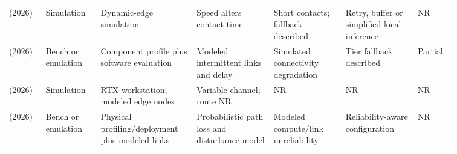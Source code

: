 \begin{table}[!tp]
\begin{tabular}{@{}Y{0.0705\linewidth}Y{0.1090\linewidth}Y{0.1598\linewidth}Y{0.1532\linewidth}Y{0.1466\linewidth}Y{0.1438\linewidth}Y{0.0724\linewidth}@{}}
\cite{R0058}\newline\mbox{(2026)} & Simulation & Dynamic-edge simulation & Speed alters contact time & Short contacts; fallback described & Retry, buffer or simplified local inference & NR \\
\cite{R0063}\newline\mbox{(2026)} & Bench or emulation & Component profile plus software evaluation & Modeled intermittent links and delay & Simulated connectivity degradation & Tier fallback described & Partial \\
\cite{R0107}\newline\mbox{(2026)} & Simulation & RTX workstation; modeled edge nodes & Variable channel; route NR & NR & NR & NR \\
\cite{R0137}\newline\mbox{(2026)} & Bench or emulation & Physical profiling\allowbreak{}/deployment plus modeled links & Probabilistic path loss and disturbance model & Modeled compute\allowbreak{}/link unreliability & Reliability-aware configuration & NR \\
\bottomrule
\end{tabular}
\end{table}
